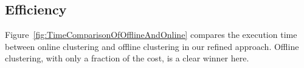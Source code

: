 \subsection{Efficiency}
Figure~\ref{fig:TimeComparisonOfOfflineAndOnline} compares the
execution time between online clustering and offline clustering
in our refined approach. Offline clustering, with only a fraction of
the cost, is a clear winner here.

